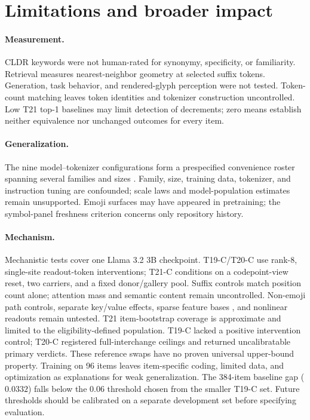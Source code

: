 \documentclass{article}
\begin{document}
\section{Limitations and broader impact}

\paragraph{Measurement.}
CLDR keywords were not human-rated for synonymy, specificity, or familiarity.
Retrieval measures
nearest-neighbor geometry at selected suffix tokens. Generation, task
behavior, and rendered-glyph perception were not tested. Token-count matching
leaves token identities and tokenizer construction uncontrolled.
Low T21 top-1 baselines may limit detection of decrements; zero means establish
neither equivalence nor unchanged outcomes for every item.

\paragraph{Generalization.}
The nine model--tokenizer configurations form a prespecified convenience roster
spanning several families and sizes \citep{yang2024qwen25,olmo2024furious,
dubey2024llama3,gemmateam2024gemma2,jiang2023mistral,benallal2025smollm2}.
Family, size, training data, tokenizer, and instruction tuning are confounded;
scale laws and model-population estimates remain unsupported. Emoji surfaces
may have appeared in pretraining; the symbol-panel
freshness criterion concerns only repository history.

\paragraph{Mechanism.}
Mechanistic tests cover one Llama 3.2 3B checkpoint. T19-C/T20-C use rank-8,
single-site readout-token interventions; T21-C conditions on a codepoint-view
reset, two carriers, and a fixed donor/gallery pool. Suffix controls match
position count alone; attention mass and semantic content remain uncontrolled.
Non-emoji path controls, separate key/value effects, sparse feature bases
\citep{bricken2023monosemanticity,cunningham2024sparse}, and nonlinear readouts
remain untested. T21 item-bootstrap coverage is approximate and limited to the
eligibility-defined population. T19-C lacked a positive intervention control;
T20-C registered full-interchange ceilings \citep{geiger2024das,wu2023boundless}
and returned uncalibratable primary verdicts. These reference swaps have no
proven universal upper-bound property. Training on 96 items leaves item-specific
coding, limited data, and optimization as explanations for weak generalization.
The 384-item baseline gap ($0.0332$) falls below the $0.06$ threshold chosen
from the smaller T19-C set. Future thresholds should be calibrated on a
separate development set before specifying evaluation.
\end{document}
